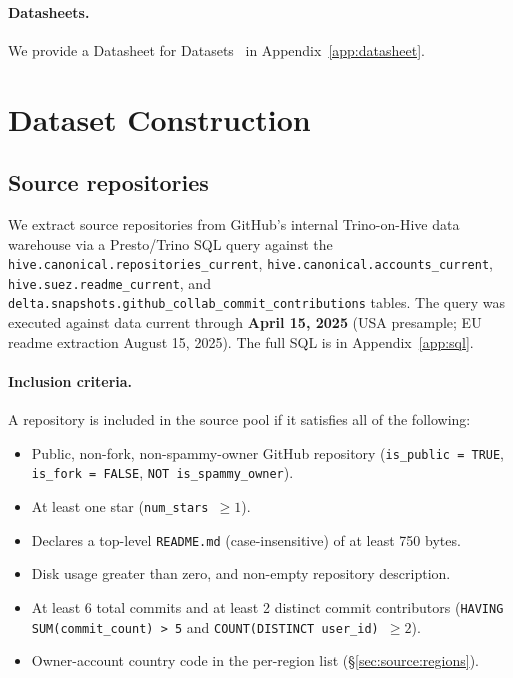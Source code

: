 \documentclass{article}
\begin{document}
\paragraph{Datasheets.} We provide a Datasheet for
Datasets~\citep{gebru2021datasheets} in Appendix~\ref{app:datasheet}.

\section{Dataset Construction}
\label{sec:construction}

\subsection{Source repositories}
\label{sec:source}

We extract source repositories from GitHub's internal Trino-on-Hive data
warehouse via a Presto/Trino SQL query against the
\texttt{hive.canonical.repositories\_current},
\texttt{hive.canonical.accounts\_current},
\texttt{hive.suez.readme\_current}, and
\texttt{delta.snapshots.github\_collab\_commit\_contributions} tables.
The query was executed against data current through \textbf{April 15,
2025} (USA presample; EU readme extraction August 15, 2025). The full
SQL is in Appendix~\ref{app:sql}.

\paragraph{Inclusion criteria.} A repository is included in the source
pool if it satisfies all of the following:
\begin{itemize}
  \item Public, non-fork, non-spammy-owner GitHub repository
    (\texttt{is\_public = TRUE}, \texttt{is\_fork = FALSE},
    \texttt{NOT is\_spammy\_owner}).
  \item At least one star (\texttt{num\_stars $\geq 1$}).
  \item Declares a top-level \texttt{README.md} (case-insensitive)
    of at least 750 bytes.
  \item Disk usage greater than zero, and non-empty repository
    description.
  \item At least 6 total commits and at least 2 distinct commit
    contributors
    (\texttt{HAVING SUM(commit\_count) > 5} and
    \texttt{COUNT(DISTINCT user\_id) $\geq 2$}).
  \item Owner-account country code in the per-region list
    (\S\ref{sec:source:regions}).
\end{itemize}
\end{document}
